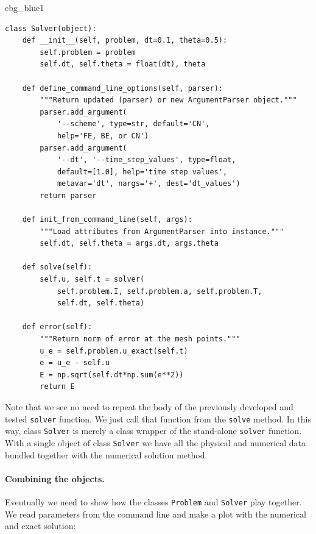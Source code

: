 \documentclass[%
oneside,                 %
final,                   %
10pt]{article}
\newenvironment{_cod_tight}[1]{
   \def\FrameCommand{\colorbox{#1}}
   \FrameRule0.6pt\MakeFramed {\FrameRestore}\vskip3mm}
   {\vskip0mm\endMakeFramed}
\newenvironment{cod}[1]{
\bgroup\rmfamily
\fboxsep=0mm\relax
\begin{_cod_tight}{#1}
\list{}{\parsep=-2mm\parskip=0mm\topsep=0pt\leftmargin=2mm
\rightmargin=2\leftmargin\leftmargin=4pt\relax}
\item\relax}
{\endlist\end{_cod_tight}\egroup}
\begin{document}
\begin{cod}{cbg_blue1}\begin{Verbatim}[numbers=none,fontsize=\fontsize{9pt}{9pt},baselinestretch=0.95,xleftmargin=2mm]
class Solver(object):
    def __init__(self, problem, dt=0.1, theta=0.5):
        self.problem = problem
        self.dt, self.theta = float(dt), theta

    def define_command_line_options(self, parser):
        """Return updated (parser) or new ArgumentParser object."""
        parser.add_argument(
            '--scheme', type=str, default='CN',
            help='FE, BE, or CN')
        parser.add_argument(
            '--dt', '--time_step_values', type=float,
            default=[1.0], help='time step values',
            metavar='dt', nargs='+', dest='dt_values')
        return parser

    def init_from_command_line(self, args):
        """Load attributes from ArgumentParser into instance."""
        self.dt, self.theta = args.dt, args.theta

    def solve(self):
        self.u, self.t = solver(
            self.problem.I, self.problem.a, self.problem.T,
            self.dt, self.theta)

    def error(self):
        """Return norm of error at the mesh points."""
        u_e = self.problem.u_exact(self.t)
        e = u_e - self.u
        E = np.sqrt(self.dt*np.sum(e**2))
        return E
\end{Verbatim}
\end{cod}
\noindent
Note that we see no need to repeat the body of the previously
developed and tested \texttt{solver} function. We just call that function from
the \texttt{solve} method.  In this way, class \texttt{Solver} is merely a class wrapper
of the stand-alone \texttt{solver} function. With a single object of class \texttt{Solver}
we have all the physical and numerical data bundled together with the numerical
solution method.


\paragraph{Combining the objects.}
Eventually we need to show how the classes \texttt{Problem} and \texttt{Solver}
play together. We read parameters from the command line and make a
plot with the numerical and exact solution:
\end{document}
